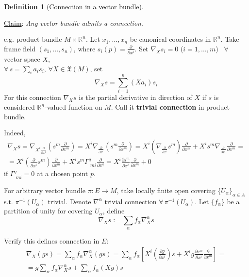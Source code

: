 \documentclass[10pt]{amsart}
\newtheorem{definition}{Definition}
\begin{document}
\begin{multicols*}{2}
\begin{definition}[Connection in a vector bundle]
\end{definition} 

\underline{Claim}: \emph{Any vector bundle admits a connection}.

e.g. product bundle $M\times \mathbb{R}^n$. Let $x_1, \dots , x_n$ be canonical coordinates in $\mathbb{R}^n$. Take frame field $(s_1, \dots, s_n)$, where $s_i(p) = \frac{\partial}{\partial x^i}$. Set $\nabla_X s_i =0 $ ($i=1,\dots , m$) \quad \, $\forall \, $ vector space $X$, \\
$\forall \, s = \sum_i a_i s_i, \, \forall X \in \mathfrak{X}(M)$, set 
\[
\nabla_X s = \sum_{i=1}^n (Xa_i) s_i
\]
For this connection $\nabla_Xs$ is the partial derivative in direction of $X$ if $s$ is considered $\mathbb{R}^n$-valued function on $M$. Call it \textbf{trivial connection} in product bundle.

Indeed,
\[
\begin{gathered}
	\nabla_X s = \nabla_{ X^i \frac{\partial}{\partial x^i}} \left( s^m \frac{\partial}{\partial x^m} \right) = X^i \nabla_{ \frac{\partial}{\partial x^i} } \left( s^m \frac{\partial}{\partial x^m} \right) = X^i \left( \nabla_{ \frac{\partial}{\partial x^i} } s^m \right) \frac{\partial}{\partial x^m} + X^i s^m \nabla_{ \frac{\partial}{\partial x^i} } \frac{\partial}{\partial x^m} = \\	
		= X^i \left( \frac{\partial}{\partial x^i} s^m \right) \frac{\partial}{\partial x^m} + X^i s^m \Gamma^q_{ \, \, mi} \frac{\partial}{\partial x^q} = X^i \frac{ \partial s^m}{ \partial x^i} \frac{\partial }{ \partial x^m } + 0 
\end{gathered}
\]
if $\Gamma^q_{ \, \, mi} =0$ at a chosen point $p$.

For arbitrary vector bundle $\pi : E \to M$, take locally finite open covering $\lbrace U_{\alpha} \rbrace_{\alpha \in A}$ s.t. $\pi^{-1}(U_{\alpha})$ trivial. Denote $\nabla^{\alpha} $ trivial connection $\forall \, \pi^{-1}(U_{\alpha})$. Let $\lbrace f_{\alpha} \rbrace$ be a partition of unity for covering $U_{\alpha}$, define 
	\[
	\nabla_X s := \sum_{\alpha} f_{\alpha} \nabla_X^{\alpha} s
	\]

Verify this defines connection in $E$:
\[
\begin{gathered}
\nabla_X(gs) = \sum_{\alpha} f_{\alpha} \nabla^{\alpha}_X(gs) = \sum_{\alpha} f_{\alpha} \left[ X^i \left( \frac{\partial g}{\partial x^i} \right) s + X^i g \frac{\partial s^m}{\partial x^i} \frac{\partial}{\partial x^m} \right] = \\
= g \sum_{\alpha} f_{\alpha} \nabla_X^{\alpha} s + \sum_{\alpha} f_{\alpha} (Xg) s
\end{gathered}
\]


\end{multicols*}
\end{document}
